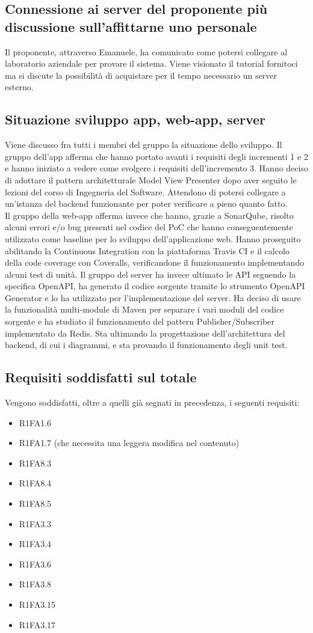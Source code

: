 \subsection{Connessione ai server del proponente più discussione sull'affittarne uno personale}
Il proponente, attraverso Emanuele, ha comunicato come potersi collegare al laboratorio aziendale per provare il sistema.
Viene visionato il tutorial fornitoci ma si discute la possibilità di acquistare per il tempo necessario un server esterno.

\subsection{Situazione sviluppo app, web-app, server}
Viene discusso fra tutti i membri del gruppo la situazione dello sviluppo.
Il gruppo dell'app afferma che hanno portato avanti i requisiti degli incrementi 1 e 2 e hanno iniziato a vedere come svolgere i requisiti dell'incremento 3.
Hanno deciso di adottare il pattern architetturale Model View Presenter dopo aver seguito le lezioni del corso di Ingegneria del Software. Attendono di potersi
collegare a un'istanza del backend funzionante per poter verificare a pieno quanto fatto.\\
Il gruppo della web-app afferma invece che hanno, grazie a SonarQube, risolto alcuni errori e/o bug presenti nel codice del PoC che hanno conseguentemente utilizzato 
come baseline per lo sviluppo dell'applicazione web. Hanno proseguito abilitando la Continuous Integration con la piattaforma Travis CI e il calcolo della code coverage
con Coveralls, verificandone il funzionamento implementando alcuni test di unità.
Il gruppo del server ha invece ultimato le API seguendo la specifica OpenAPI, ha generato il codice sorgente tramite lo strumento OpenAPI Generator e lo ha utilizzato per l'implementazione del server.
Ha deciso di usare la funzionalità multi-module di Maven per separare i vari moduli del codice sorgente e ha studiato il funzionamento del pattern Publisher/Subscriber implementato da Redis.
Sta ultimando la progettazione dell'architettura del backend, di cui i diagrammi, e sta provando il funzionamento degli unit test.

\subsection{Requisiti soddisfatti sul totale}
Vengono soddisfatti, oltre a quelli già segnati in precedenza, i seguenti requisiti:
\begin{itemize}
	\item R1FA1.6
	\item R1FA1.7 (che necessita una leggera modifica nel contenuto)
	\item R1FA8.3
	\item R1FA8.4
	\item R1FA8.5
	\item R1FA3.3
	\item R1FA3.4
	\item R1FA3.6
	\item R1FA3.8
	\item R1FA3.15
	\item R1FA3.17
\end{itemize}

\clearpage